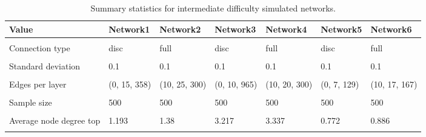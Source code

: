 \documentclass[
]{article}
\begin{document}
\begin{table}

\caption{\label{tab:unnamed-chunk-6}Summary statistics for intermediate difficulty simulated networks.}
\centering
\fontsize{10}{12}\selectfont
\fontsize{10}{12}\selectfont
\begin{tabular}[t]{>{\raggedright\arraybackslash}p{8em}llllll}
\toprule
Value & Network1 & Network2 & Network3 & Network4 & Network5 & Network6\\
\midrule
\cellcolor{gray!6}{Subgraph type} & \cellcolor{gray!6}{small world} & \cellcolor{gray!6}{small world} & \cellcolor{gray!6}{scale free} & \cellcolor{gray!6}{scale free} & \cellcolor{gray!6}{random graph} & \cellcolor{gray!6}{random graph}\\
Connection type & disc & full & disc & full & disc & full\\
\cellcolor{gray!6}{Layers} & \cellcolor{gray!6}{3} & \cellcolor{gray!6}{3} & \cellcolor{gray!6}{3} & \cellcolor{gray!6}{3} & \cellcolor{gray!6}{3} & \cellcolor{gray!6}{3}\\
Standard deviation & 0.1 & 0.1 & 0.1 & 0.1 & 0.1 & 0.1\\
\cellcolor{gray!6}{Nodes per layer} & \cellcolor{gray!6}{(5, 15, 300)} & \cellcolor{gray!6}{(5, 15, 300)} & \cellcolor{gray!6}{(5, 15, 300)} & \cellcolor{gray!6}{(5, 15, 300)} & \cellcolor{gray!6}{(5, 12, 167)} & \cellcolor{gray!6}{(5, 12, 167)}\\
\addlinespace
Edges per layer & (0, 15, 358) & (10, 25, 300) & (0, 10, 965) & (10, 20, 300) & (0, 7, 129) & (10, 17, 167)\\
\cellcolor{gray!6}{Subgraph probability} & \cellcolor{gray!6}{0.05} & \cellcolor{gray!6}{0.05} & \cellcolor{gray!6}{0.05} & \cellcolor{gray!6}{0.05} & \cellcolor{gray!6}{0.05} & \cellcolor{gray!6}{0.05}\\
Sample size & 500 & 500 & 500 & 500 & 500 & 500\\
\cellcolor{gray!6}{Modularity (top)} & \cellcolor{gray!6}{0.8} & \cellcolor{gray!6}{0.686} & \cellcolor{gray!6}{0.781} & \cellcolor{gray!6}{0.739} & \cellcolor{gray!6}{0.789} & \cellcolor{gray!6}{0.663}\\
Average node degree top & 1.193 & 1.38 & 3.217 & 3.337 & 0.772 & 0.886\\
\addlinespace
\cellcolor{gray!6}{Avg connections within top communities} & \cellcolor{gray!6}{71.6} & \cellcolor{gray!6}{73.4} & \cellcolor{gray!6}{193} & \cellcolor{gray!6}{191.6} & \cellcolor{gray!6}{25.8} & \cellcolor{gray!6}{25.8}\\

\end{tabular}
\end{table}
\end{document}
